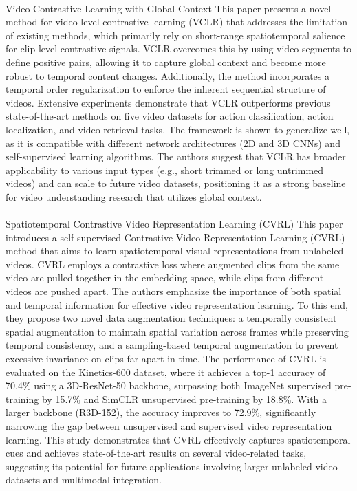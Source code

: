 \documentclass[11pt,a4paper]{report}
\begin{document}
\paragraph{} Video Contrastive Learning with Global Context \cite{kuang2021video}
This paper presents a novel method for video-level contrastive learning (VCLR) that addresses the limitation of existing methods, which primarily rely on short-range spatiotemporal salience for clip-level contrastive signals. VCLR overcomes this by using video segments to define positive pairs, allowing it to capture global context and become more robust to temporal content changes. Additionally, the method incorporates a temporal order regularization to enforce the inherent sequential structure of videos. Extensive experiments demonstrate that VCLR outperforms previous state-of-the-art methods on five video datasets for action classification, action localization, and video retrieval tasks. The framework is shown to generalize well, as it is compatible with different network architectures (2D and 3D CNNs) and self-supervised learning algorithms. The authors suggest that VCLR has broader applicability to various input types (e.g., short trimmed or long untrimmed videos) and can scale to future video datasets, positioning it as a strong baseline for video understanding research that utilizes global context.

\paragraph{} Spatiotemporal Contrastive Video Representation Learning (CVRL)
This paper \cite{qian2021spatiotemporal} introduces a self-supervised Contrastive Video Representation Learning (CVRL) method that aims to learn spatiotemporal visual representations from unlabeled videos. CVRL employs a contrastive loss where augmented clips from the same video are pulled together in the embedding space, while clips from different videos are pushed apart. The authors emphasize the importance of both spatial and temporal information for effective video representation learning. To this end, they propose two novel data augmentation techniques: a temporally consistent spatial augmentation to maintain spatial variation across frames while preserving temporal consistency, and a sampling-based temporal augmentation to prevent excessive invariance on clips far apart in time. The performance of CVRL is evaluated on the Kinetics-600 dataset, where it achieves a top-1 accuracy of 70.4\% using a 3D-ResNet-50 backbone, surpassing both ImageNet supervised pre-training by 15.7\% and SimCLR unsupervised pre-training by 18.8\%. With a larger backbone (R3D-152), the accuracy improves to 72.9\%, significantly narrowing the gap between unsupervised and supervised video representation learning. This study demonstrates that CVRL effectively captures spatiotemporal cues and achieves state-of-the-art results on several video-related tasks, suggesting its potential for future applications involving larger unlabeled video datasets and multimodal integration.
\end{document}
